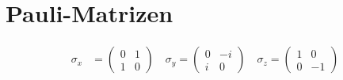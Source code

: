\documentclass[ex]{exercise}
\begin{document}
\section{Pauli-Matrizen}
\begin{align*}
    \sigma_x &= \begin{pmatrix}
        0&1\\1&0
    \end{pmatrix}\quad
    \sigma_y = \begin{pmatrix}
        0&-i\\i&0
    \end{pmatrix}\quad
    \sigma_z = \begin{pmatrix}
        1&0\\0&-1
    \end{pmatrix}
\end{align*}
\end{document}

